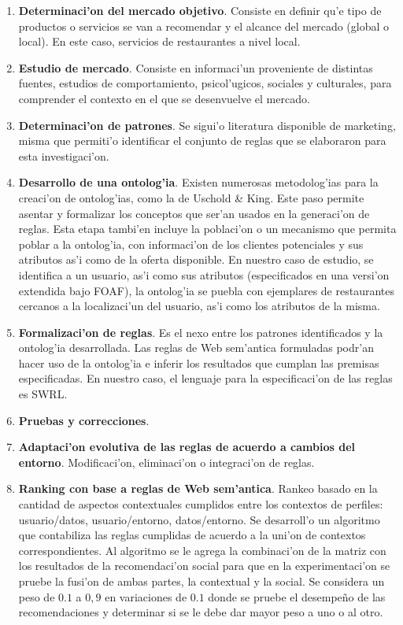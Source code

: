 \documentclass[11pt]{article}
\begin{document}
\begin{enumerate}
\item \textbf{Determinaci'on del mercado objetivo}. Consiste en definir qu'e tipo de productos o servicios se van a recomendar y el alcance del mercado (global o local). En este caso, servicios de restaurantes a nivel local.
\item \textbf{Estudio de mercado}. Consiste en informaci'un proveniente de distintas fuentes, estudios de comportamiento, psicol'ugicos, sociales y culturales, para comprender el contexto en el que se desenvuelve el mercado.
\item \textbf{Determinaci'on de patrones}. Se sigui'o literatura disponible de marketing, misma que permiti'o identificar el conjunto de reglas que se elaboraron para esta investigaci'on.
\item \textbf{Desarrollo de una ontolog'ia}. Existen numerosas metodolog'ias para la creaci'on de ontolog'ias, como la de Uschold \& King. Este paso permite asentar y formalizar los conceptos que ser'an usados en la generaci'on de reglas. Esta etapa tambi'en incluye la poblaci'on o un mecanismo que permita poblar a la ontolog'ia, con
informaci'on de los clientes potenciales y sus atributos as'i como de la oferta disponible. En nuestro caso de estudio, se identifica a un usuario, as'i como sus atributos (especificados en una versi'on extendida bajo FOAF), la ontolog'ia
se puebla con ejemplares de restaurantes cercanos a la localizaci'un del usuario, as'i como los atributos de la misma.

\item \textbf{Formalizaci'on de reglas}. Es el nexo entre los patrones identificados y la ontolog'ia desarrollada. Las reglas de Web sem'antica formuladas podr'an hacer uso de la ontolog'ia e inferir los resultados que cumplan las premisas especificadas. En nuestro caso, el lenguaje para la especificaci'on de las reglas es SWRL.
\item \textbf{Pruebas y correcciones}.
\item \textbf{Adaptaci'on evolutiva de las reglas de acuerdo a cambios del entorno}. Modificaci'on, eliminaci'on o integraci'on de reglas.
\item \textbf{Ranking con base a reglas de Web sem'antica}. Rankeo basado en la cantidad de aspectos contextuales cumplidos entre los contextos de perfiles: usuario/datos, usuario/entorno, datos/entorno. Se desarroll'o un algoritmo que contabiliza las reglas cumplidas de acuerdo a la uni'on de contextos correspondientes. Al algoritmo se le agrega la combinaci'on de la matriz con los resultados de la recomendaci'on social para que en la experimentaci'on se pruebe la fusi'on de ambas partes, la contextual y la social. Se considera un peso de $0.1$ a $0,9$ en variaciones de $0.1$ donde se pruebe el desempe\~{n}o de las recomendaciones y determinar si se le debe dar mayor peso a uno o al otro.
\end{enumerate}
\end{document}
